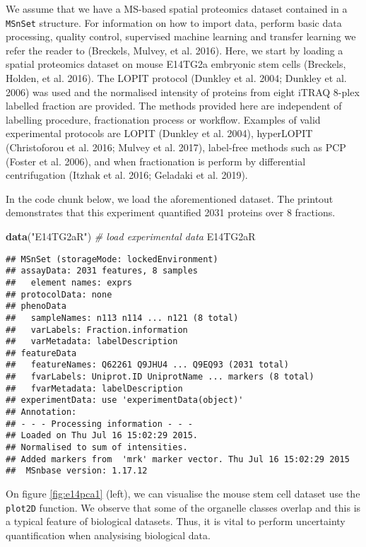 \documentclass[]{article}
\newenvironment{Shaded}{\begin{snugshade}}{\end{snugshade}}
\newcommand{\KeywordTok}[1]{\textcolor[rgb]{0.13,0.29,0.53}{\textbf{{#1}}}}
\newcommand{\StringTok}[1]{\textcolor[rgb]{0.31,0.60,0.02}{{#1}}}
\newcommand{\CommentTok}[1]{\textcolor[rgb]{0.56,0.35,0.01}{\textit{{#1}}}}
\newcommand{\NormalTok}[1]{{#1}}
\begin{document}
We assume that we have a MS-based spatial proteomics dataset contained
in a \texttt{MSnSet} structure. For information on how to import data,
perform basic data processing, quality control, supervised machine
learning and transfer learning we refer the reader to (Breckels, Mulvey,
et al. 2016). Here, we start by loading a spatial proteomics dataset on
mouse E14TG2a embryonic stem cells (Breckels, Holden, et al. 2016). The
LOPIT protocol (Dunkley et al. 2004; Dunkley et al. 2006) was used and
the normalised intensity of proteins from eight iTRAQ 8-plex labelled
fraction are provided. The methods provided here are independent of
labelling procedure, fractionation process or workflow. Examples of
valid experimental protocols are LOPIT (Dunkley et al. 2004), hyperLOPIT
(Christoforou et al. 2016; Mulvey et al. 2017), label-free methods such
as PCP (Foster et al. 2006), and when fractionation is perform by
differential centrifugation (Itzhak et al. 2016; Geladaki et al. 2019).

In the code chunk below, we load the aforementioned dataset. The
printout demonstrates that this experiment quantified 2031 proteins over
8 fractions.

\begin{Shaded}
\begin{Highlighting}[]
\KeywordTok{data}\NormalTok{(}\StringTok{"E14TG2aR"}\NormalTok{) }\CommentTok{# load experimental data}
\NormalTok{E14TG2aR}
\end{Highlighting}
\end{Shaded}

\begin{verbatim}
## MSnSet (storageMode: lockedEnvironment)
## assayData: 2031 features, 8 samples 
##   element names: exprs 
## protocolData: none
## phenoData
##   sampleNames: n113 n114 ... n121 (8 total)
##   varLabels: Fraction.information
##   varMetadata: labelDescription
## featureData
##   featureNames: Q62261 Q9JHU4 ... Q9EQ93 (2031 total)
##   fvarLabels: Uniprot.ID UniprotName ... markers (8 total)
##   fvarMetadata: labelDescription
## experimentData: use 'experimentData(object)'
## Annotation:  
## - - - Processing information - - -
## Loaded on Thu Jul 16 15:02:29 2015. 
## Normalised to sum of intensities. 
## Added markers from  'mrk' marker vector. Thu Jul 16 15:02:29 2015 
##  MSnbase version: 1.17.12
\end{verbatim}

On figure \ref{fig:e14pca1} (left), we can visualise the mouse stem cell
dataset use the \texttt{plot2D} function. We observe that some of the
organelle classes overlap and this is a typical feature of biological
datasets. Thus, it is vital to perform uncertainty quantification when
analysising biological data.
\end{document}
